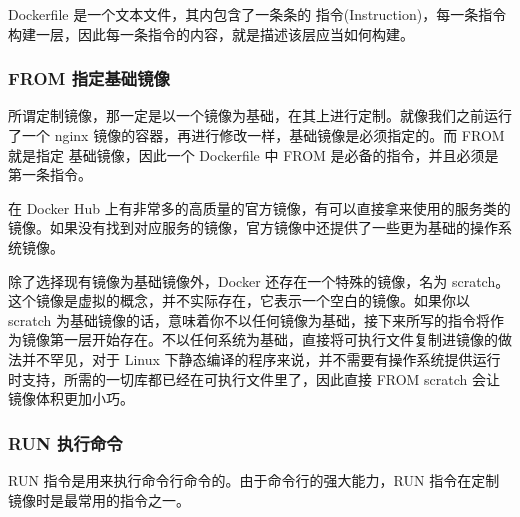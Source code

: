 \documentclass[UTF8]{ctexart}
\begin{document}
Dockerfile 是一个文本文件，其内包含了一条条的 指令(Instruction)，每一条指令构建一层，因此每一条指令的内容，就是描述该层应当如何构建。

\subsubsection*{FROM 指定基础镜像}
所谓定制镜像，那一定是以一个镜像为基础，在其上进行定制。就像我们之前运行了一个 nginx 镜像的容器，再进行修改一样，基础镜像是必须指定的。而 FROM 就是指定 基础镜像，因此一个 Dockerfile 中 FROM 是必备的指令，并且必须是第一条指令。

在 Docker Hub 上有非常多的高质量的官方镜像，有可以直接拿来使用的服务类的镜像。如果没有找到对应服务的镜像，官方镜像中还提供了一些更为基础的操作系统镜像。

除了选择现有镜像为基础镜像外，Docker 还存在一个特殊的镜像，名为 scratch。这个镜像是虚拟的概念，并不实际存在，它表示一个空白的镜像。如果你以 scratch 为基础镜像的话，意味着你不以任何镜像为基础，接下来所写的指令将作为镜像第一层开始存在。不以任何系统为基础，直接将可执行文件复制进镜像的做法并不罕见，对于 Linux 下静态编译的程序来说，并不需要有操作系统提供运行时支持，所需的一切库都已经在可执行文件里了，因此直接 FROM scratch 会让镜像体积更加小巧。

\subsubsection*{RUN 执行命令}
RUN 指令是用来执行命令行命令的。由于命令行的强大能力，RUN 指令在定制镜像时是最常用的指令之一。
\end{document}
